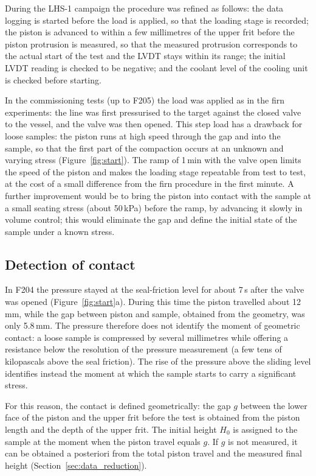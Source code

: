 During the LHS-1 campaign the procedure was refined as follows: the data logging is started before the load is applied, so that the loading stage is recorded; the piston is advanced to within a few millimetres of the upper frit before the piston protrusion is measured, so that the measured protrusion corresponds to the actual start of the test and the LVDT stays within its range; the initial LVDT reading is checked to be negative; and the coolant level of the cooling unit is checked before starting.

In the commissioning tests (up to F205) the load was applied as in the firn experiments: the line was first pressurised to the target against the closed valve to the vessel, and the valve was then opened. This step load has a drawback for loose samples: the piston runs at high speed through the gap and into the sample, so that the first part of the compaction occurs at an unknown and varying stress (Figure~\ref{fig:start}). The ramp of 1\,min with the valve open limits the speed of the piston and makes the loading stage repeatable from test to test, at the cost of a small difference from the firn procedure in the first minute. A further improvement would be to bring the piston into contact with the sample at a small seating stress (about 50\,kPa) before the ramp, by advancing it slowly in volume control; this would eliminate the gap and define the initial state of the sample under a known stress.

\subsection{Detection of contact}

In F204 the pressure stayed at the seal-friction level for about 7\,s after the valve was opened (Figure~\ref{fig:start}a). During this time the piston travelled about 12\,mm, while the gap between piston and sample, obtained from the geometry, was only 5.8\,mm. The pressure therefore does not identify the moment of geometric contact: a loose sample is compressed by several millimetres while offering a resistance below the resolution of the pressure measurement (a few tens of kilopascals above the seal friction). The rise of the pressure above the sliding level identifies instead the moment at which the sample starts to carry a significant stress.

For this reason, the contact is defined geometrically: the gap $g$ between the lower face of the piston and the upper frit before the test is obtained from the piston length and the depth of the upper frit. The initial height $H_0$ is assigned to the sample at the moment when the piston travel equals $g$. If $g$ is not measured, it can be obtained a posteriori from the total piston travel and the measured final height (Section~\ref{sec:data_reduction}).

